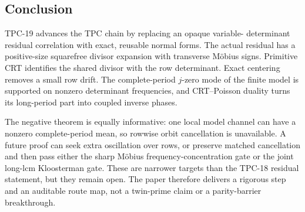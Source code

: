\subsection{Conclusion}

TPC-19 advances the TPC chain by replacing an opaque variable-
determinant residual correlation with exact, reusable normal forms.
The actual residual has a positive-size squarefree divisor expansion
with transverse M\"obius signs.  Primitive CRT identifies the shared
divisor with the row determinant.  Exact centering removes a small row
drift.  The complete-period \(j\)-zero mode of the finite model is
supported on nonzero determinant frequencies, and CRT--Poisson duality
turns its long-period part into coupled inverse phases.

The negative theorem is equally informative: one local model channel
can have a nonzero complete-period mean, so rowwise orbit cancellation
is unavailable.  A future proof can seek extra oscillation over rows,
or preserve matched cancellation and then pass either the sharp
M\"obius frequency-concentration gate or the joint long-lcm
Kloosterman gate.  These are narrower targets than the TPC-18 residual
statement, but they remain open.  The paper therefore
delivers a rigorous step and an auditable route map, not a twin-prime
claim or a parity-barrier breakthrough.
